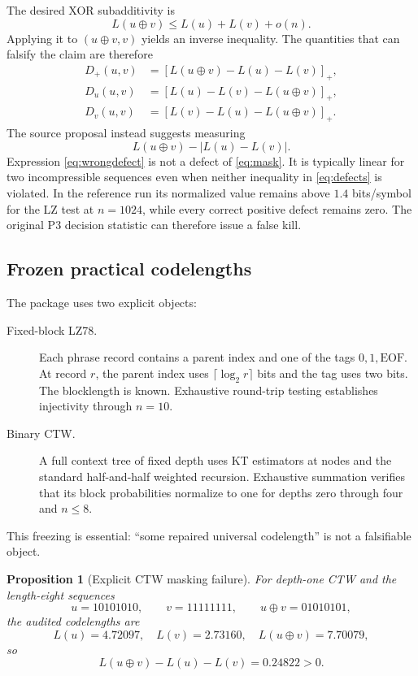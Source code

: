 \documentclass[11pt]{article}
\newtheorem{proposition}{Proposition}
\begin{document}
The desired XOR subadditivity is
\begin{equation}
 L(u\oplus v)\le L(u)+L(v)+o(n).
 \label{eq:mask}
\end{equation}
Applying it to $(u\oplus v,v)$ yields an inverse inequality.  The quantities that can falsify the claim are therefore
\begin{align}
 D_+(u,v)&=[L(u\oplus v)-L(u)-L(v)]_+,\\
 D_u(u,v)&=[L(u)-L(v)-L(u\oplus v)]_+,\\
 D_v(u,v)&=[L(v)-L(u)-L(u\oplus v)]_+.
 \label{eq:defects}
\end{align}
The source proposal instead suggests measuring
\begin{equation}
 L(u\oplus v)-|L(u)-L(v)|.
 \label{eq:wrongdefect}
\end{equation}
Expression \eqref{eq:wrongdefect} is not a defect of \eqref{eq:mask}.  It is typically linear for two incompressible sequences even when neither inequality in \eqref{eq:defects} is violated.  In the reference run its normalized value remains above $1.4$ bits/symbol for the LZ test at $n=1024$, while every correct positive defect remains zero.  The original P3 decision statistic can therefore issue a false kill.

\subsection{Frozen practical codelengths}

The package uses two explicit objects:
\begin{description}
\item[Fixed-block LZ78.] Each phrase record contains a parent index and one of the tags $0,1,\mathrm{EOF}$.  At record $r$, the parent index uses $\lceil\log_2 r\rceil$ bits and the tag uses two bits.  The blocklength is known.  Exhaustive round-trip testing establishes injectivity through $n=10$.
\item[Binary CTW.] A full context tree of fixed depth uses KT estimators at nodes and the standard half-and-half weighted recursion.  Exhaustive summation verifies that its block probabilities normalize to one for depths zero through four and $n\le8$.
\end{description}
This freezing is essential: ``some repaired universal codelength'' is not a falsifiable object.

\begin{proposition}[Explicit CTW masking failure]
For depth-one CTW and the length-eight sequences
\[
 u=10101010,
 \qquad
 v=11111111,
 \qquad
 u\oplus v=01010101,
\]
the audited codelengths are
\[
 L(u)=4.72097,
 \quad
 L(v)=2.73160,
 \quad
 L(u\oplus v)=7.70079,
\]
so
\begin{equation}
 L(u\oplus v)-L(u)-L(v)=0.24822>0.
\end{equation}
\end{proposition}
\end{document}
